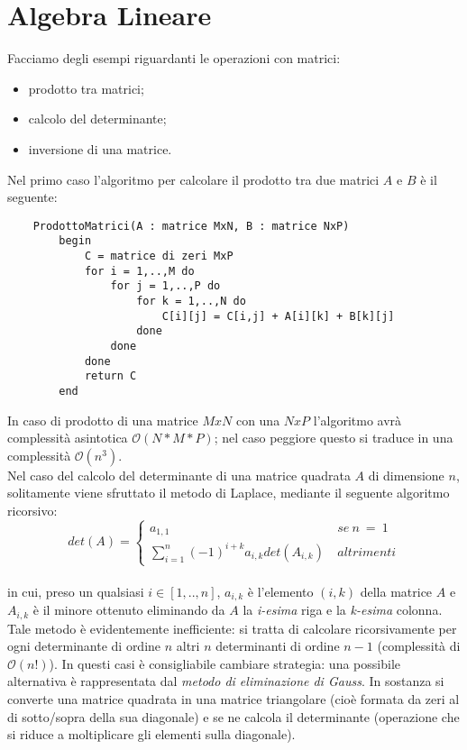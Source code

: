 \section{Algebra Lineare}
Facciamo degli esempi riguardanti le operazioni con matrici:
\begin{itemize}
\item{prodotto tra matrici;}
\item{calcolo del determinante;}
\item{inversione di una matrice.}
\end{itemize}
\newpage
\noindent Nel primo caso l'algoritmo per calcolare il prodotto tra due matrici $A$ e $B$ è il seguente:
\begin{verbatim}
    ProdottoMatrici(A : matrice MxN, B : matrice NxP)
        begin
            C = matrice di zeri MxP
            for i = 1,..,M do
                for j = 1,..,P do
                    for k = 1,..,N do
                        C[i][j] = C[i,j] + A[i][k] + B[k][j]
                    done
                done
            done
            return C
        end
\end{verbatim}
In caso di prodotto di una matrice $MxN$ con una $NxP$ l'algoritmo avrà complessità asintotica  $\mathcal {O}(N*M*P)$; nel caso peggiore questo si traduce in una complessità $\mathcal {O}(n^3)$.\\
Nel caso del calcolo del determinante di una matrice quadrata $A$ di dimensione $n$, solitamente viene sfruttato il metodo di Laplace, mediante il seguente algoritmo ricorsivo:
\[det(A) =\left\{
  \begin{array}{lr}
    a_{1,1} & \ se \ n  \ = \ 1 \\
    \sum\limits_{i=1}^n (-1)^{i+k} a_{i,k} det(A_{i,k}) & \ altrimenti
  \end{array}
\right.
\]\\
in cui, preso un qualsiasi $i \in [1,..,n]$, $a_{i,k}$ è l'elemento $(i,k)$ della matrice $A$ e $A_{i,k}$ è il minore ottenuto eliminando da $A$ la \textit{i-esima} riga e la \textit{k-esima} colonna.\\
Tale metodo è evidentemente inefficiente: si tratta di calcolare ricorsivamente per ogni determinante di ordine $n$ altri $n$ determinanti di ordine $n-1$ (complessità di $\mathcal {O}(n!)$). In questi casi è consigliabile cambiare strategia: una possibile alternativa è rappresentata dal \textit{metodo di eliminazione di Gauss}. In sostanza si converte una matrice quadrata in una matrice triangolare (cioè formata da zeri al di sotto/sopra della sua diagonale) e se ne calcola il determinante (operazione che si riduce a moltiplicare gli elementi sulla diagonale).
